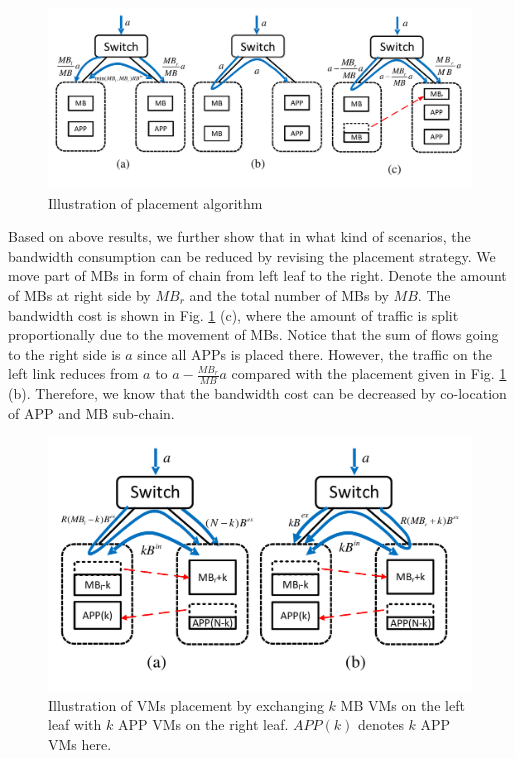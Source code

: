 \documentclass[10pt, conference, letterpaper]{IEEEtran}
\begin{document}
\begin{figure}
	\centering
		\includegraphics[width=4 in]{fig/intuition.pdf}
	\caption{Illustration of placement algorithm}
	\label{fig:intuition}
\end{figure} 

Based on above results, we further show that in what kind of scenarios, the bandwidth consumption can be reduced by revising the placement strategy. We move part of MBs in form of chain from left leaf to the right. Denote the amount of MBs at right side by $MB_{r}$ and the total number of MBs by $MB$. The bandwidth cost is shown in Fig. \ref{fig:intuition} (c), where the amount of traffic is split proportionally due to the movement of MBs. Notice that the sum of flows going to the right side is $a$ since all APPs is placed there. However, the traffic on the left link reduces from $a$ to $a-\frac{MB_{r}}{MB}a$ compared with the placement given in Fig. \ref{fig:intuition} (b). Therefore, we know that the bandwidth cost can be decreased by co-location of APP and MB sub-chain.
\begin{figure}
	\centering
		\includegraphics[width=3.5 in]{fig/intuition2.pdf}
	\caption{Illustration of VMs placement by exchanging $k$ MB VMs on the left leaf with $k$ APP VMs on the right leaf. $APP(k)$ denotes $k$ APP VMs here. }
	\label{fig:intuition2}
\end{figure} 
\end{document}

